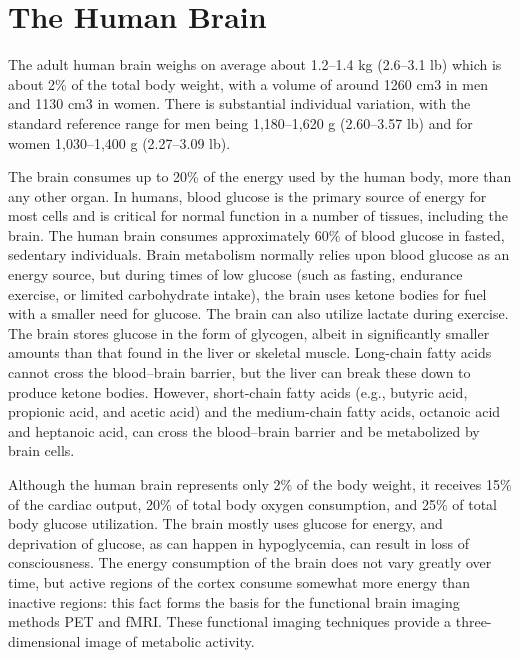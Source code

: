 \hypertarget{the-human-brain}{%
\section{The Human Brain}\label{the-human-brain}}

The adult human brain weighs on average about 1.2--1.4 kg (2.6--3.1 lb) which is about 2\% of the total body weight, with a volume of around 1260 cm3 in men and 1130 cm3 in women. There is substantial individual variation, with the standard reference range for men being 1,180--1,620 g (2.60--3.57 lb) and for women 1,030--1,400 g (2.27--3.09 lb).

The brain consumes up to 20\% of the energy used by the human body, more than any other organ. In humans, blood glucose is the primary source of energy for most cells and is critical for normal function in a number of tissues, including the brain. The human brain consumes approximately 60\% of blood glucose in fasted, sedentary individuals. Brain metabolism normally relies upon blood glucose as an energy source, but during times of low glucose (such as fasting, endurance exercise, or limited carbohydrate intake), the brain uses ketone bodies for fuel with a smaller need for glucose. The brain can also utilize lactate during exercise. The brain stores glucose in the form of glycogen, albeit in significantly smaller amounts than that found in the liver or skeletal muscle. Long-chain fatty acids cannot cross the blood--brain barrier, but the liver can break these down to produce ketone bodies. However, short-chain fatty acids (e.g., butyric acid, propionic acid, and acetic acid) and the medium-chain fatty acids, octanoic acid and heptanoic acid, can cross the blood--brain barrier and be metabolized by brain cells.

Although the human brain represents only 2\% of the body weight, it receives 15\% of the cardiac output, 20\% of total body oxygen consumption, and 25\% of total body glucose utilization. The brain mostly uses glucose for energy, and deprivation of glucose, as can happen in hypoglycemia, can result in loss of consciousness. The energy consumption of the brain does not vary greatly over time, but active regions of the cortex consume somewhat more energy than inactive regions: this fact forms the basis for the functional brain imaging methods PET and fMRI. These functional imaging techniques provide a three-dimensional image of metabolic activity.

